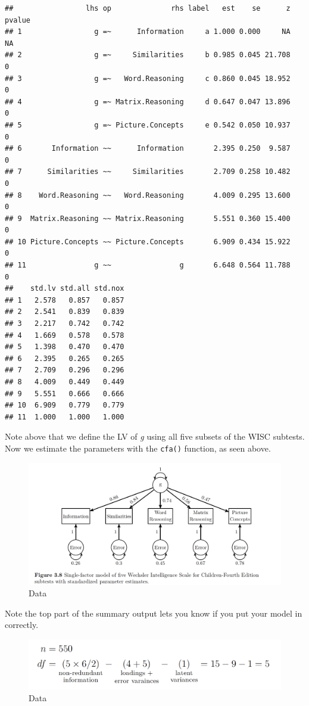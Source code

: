 \documentclass[]{book}
\theoremstyle{definition}
\theoremstyle{definition}
\theoremstyle{definition}
\theoremstyle{remark}
\begin{document}
\begin{verbatim}
##                 lhs op              rhs label   est    se      z pvalue
## 1                 g =~      Information     a 1.000 0.000     NA     NA
## 2                 g =~     Similarities     b 0.985 0.045 21.708      0
## 3                 g =~   Word.Reasoning     c 0.860 0.045 18.952      0
## 4                 g =~ Matrix.Reasoning     d 0.647 0.047 13.896      0
## 5                 g =~ Picture.Concepts     e 0.542 0.050 10.937      0
## 6       Information ~~      Information       2.395 0.250  9.587      0
## 7      Similarities ~~     Similarities       2.709 0.258 10.482      0
## 8    Word.Reasoning ~~   Word.Reasoning       4.009 0.295 13.600      0
## 9  Matrix.Reasoning ~~ Matrix.Reasoning       5.551 0.360 15.400      0
## 10 Picture.Concepts ~~ Picture.Concepts       6.909 0.434 15.922      0
## 11                g ~~                g       6.648 0.564 11.788      0
##    std.lv std.all std.nox
## 1   2.578   0.857   0.857
## 2   2.541   0.839   0.839
## 3   2.217   0.742   0.742
## 4   1.669   0.578   0.578
## 5   1.398   0.470   0.470
## 6   2.395   0.265   0.265
## 7   2.709   0.296   0.296
## 8   4.009   0.449   0.449
## 9   5.551   0.666   0.666
## 10  6.909   0.779   0.779
## 11  1.000   1.000   1.000
\end{verbatim}

Note above that we define the LV of \emph{g} using all five subsets of
the WISC subtests. Now we estimate the parameters with the
\texttt{cfa()} function, as seen above.

\begin{figure}
\centering
\includegraphics{img/beaupath12.png}
\caption{Data}
\end{figure}

Note the top part of the summary output lets you know if you put your
model in correctly.

\begin{figure}
\centering
\includegraphics{img/beaupath13.png}
\caption{Data}
\end{figure}
\end{document}
